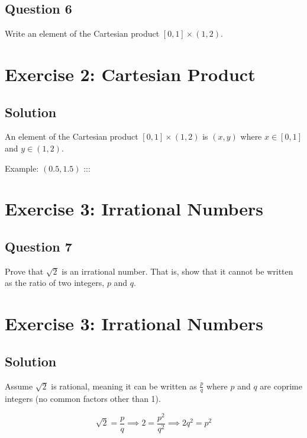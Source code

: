 \documentclass[
  11pt,
  letterpaper,
  DIV=11,
  numbers=noendperiod]{scrartcl}
\begin{document}
\subsection{Question 6}\label{question-6}

Write an element of the Cartesian product \([0, 1] \times (1, 2)\).

\section{Exercise 2: Cartesian
Product}\label{exercise-2-cartesian-product-1}

\subsection{Solution}\label{solution-1}

An element of the Cartesian product \([0, 1] \times (1, 2)\) is
\((x, y)\) where \(x \in [0, 1]\) and \(y \in (1, 2)\).

Example: \((0.5, 1.5)\) :::

\section{Exercise 3: Irrational
Numbers}\label{exercise-3-irrational-numbers}

\subsection{Question 7}\label{question-7}

Prove that \(\sqrt{2}\) is an irrational number. That is, show that it
cannot be written as the ratio of two integers, \(p\) and \(q\).

\section{Exercise 3: Irrational
Numbers}\label{exercise-3-irrational-numbers-1}

\subsection{Solution}\label{solution-2}

Assume \(\sqrt{2}\) is rational, meaning it can be written as
\(\frac{p}{q}\) where \(p\) and \(q\) are coprime integers (no common
factors other than 1).

\[
\sqrt{2} = \frac{p}{q} \implies 2 = \frac{p^2}{q^2} \implies 2q^2 = p^2
\]
\end{document}
